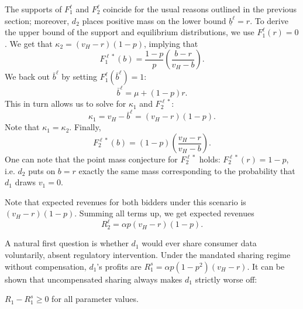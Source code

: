 \noindent The supports of $F_1^{\ell}$ and $F_2^{\ell}$ coincide for the usual reasons outlined in the previous section; moreover, $d_2$ places positive mass on the lower bound $\underline{b}^\ell = r$. To derive the upper bound of the support and equilibrium distributions, we use $F_1^{\ell}(r) = 0$. We get that $\kappa_2 = (v_H-r)(1-p)$, implying that
\begin{equation*}
    F_1^{\ell *}(b) = \frac{1-p}{p} \left( \frac{b-r}{v_H-b} \right).
\end{equation*}
We back out $\bar{b}^\ell$ by setting $ F_1^{\ell}(\bar{b}^\ell) = 1$:
\begin{equation*}
    \bar{b}^\ell = \mu+(1-p)r.
\end{equation*}
This in turn allows us to solve for $\kappa_1$ and $F_2^{\ell *}$:
\begin{equation*}
    \kappa_1 = v_H- \bar{b}^\ell = (v_H-r)(1-p).
\end{equation*}
Note that $\kappa_1 = \kappa_2$. Finally,
\begin{equation*}
    F_2^{\ell *}(b) = (1-p)\left(\frac{v_H-r}{v_H-b}\right).
\end{equation*}
One can note that the point mass conjecture for $F_2^{\ell *}$ holds: $F_2^{\ell *}(r) = 1-p$, i.e. $d_2$ puts on $b = r$ exactly the same mass corresponding to the probability that $d_1$ draws $v_1 = 0$. \par

\noindent Note that expected revenues for both bidders under this scenario is $(v_H-r)(1-p)$. Summing all terms up, we get expected revenues
\begin{equation*}
    R_2^\ell = \alpha p (v_H-r)(1-p).
\end{equation*}

\noindent A natural first question is whether $d_1$ would ever share consumer data voluntarily, absent regulatory intervention. Under the mandated sharing regime without compensation, $d_1$'s profits are $R_1^s = \alpha p (1-p^2)(v_H-r)$. It can be shown that uncompensated sharing always makes $d_1$ strictly worse off:
\begin{lem}\label{no-sharing}
    $R_1 - R_1^s \geq0$ for all parameter values.
\end{lem}

